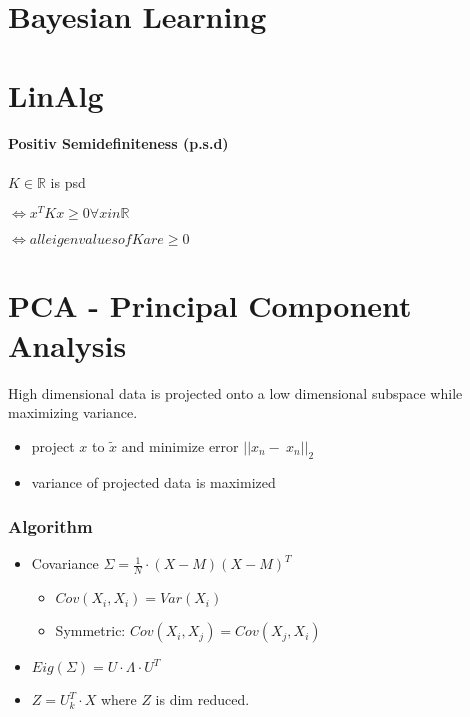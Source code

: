 \documentclass[11pt,twocolumn]{article}
\begin{document}
\section{Bayesian Learning}


\section{LinAlg}

\paragraph{Positiv Semidefiniteness (p.s.d)}

$K \in \mathbb{R}$ is psd 

$\iff x^TKx \geq 0 \forall x in \mathbb{R}$

$\iff all eigenvalues of K are \geq 0$

\maketitle



\section{PCA - Principal Component Analysis}

High dimensional data is projected onto a low dimensional subspace while maximizing variance.

\begin{itemize}
\item project $x$ to $\tilde{x}$ and minimize error $|| x_n - ~x_n ||_2$
\item variance of projected data is maximized
\end{itemize}

\subsubsection{Algorithm}

\begin{itemize}
\item Covariance $\Sigma = \frac{1}{N} \cdot (  X - M ) ( X - M )^T$
\begin{itemize}
\item $Cov(X_i, X_i) = Var(X_i)$
\item Symmetric: $ Cov(X_i,X_j) = Cov(X_j, X_i)$
\end{itemize}
\item $Eig(\Sigma) = U \cdot \Lambda \cdot U^T$
\item $Z = U_k^T \cdot X$ where $Z$ is dim reduced.

\end{itemize}
\end{document}
